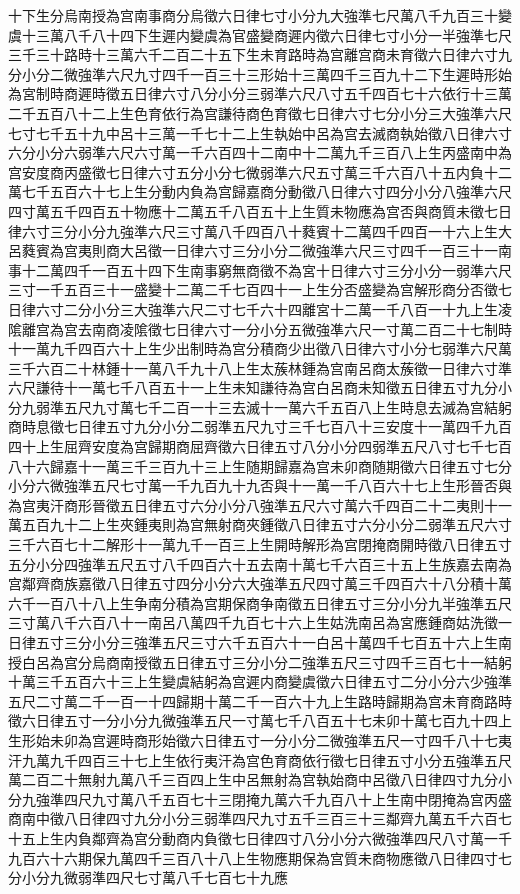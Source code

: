 {十下生分烏南授為宫南事商分烏徵六日律七寸小分九大強準七尺萬八千九百三十變虞十三萬八千八十四下生遲内變虞為官盛變商遲内徵六日律七寸小分一半強準七尺三千三十路時十三萬六千二百二十五下生未育路時為宫離宫商未育徵六日律六寸九分小分二微強準六尺九寸四千一百三十三形始十三萬四千三百九十二下生遲時形始為宮制時商遲時徵五日律六寸八分小分三弱準六尺八寸五千四百七十六依行十三萬二千五百八十二上生色育依行為宫謙待商色育徵七日律六寸七分小分三大強準六尺七寸七千五十九中呂十三萬一千七十二上生執始中呂為宫去滅商執始徵八日律六寸六分小分六弱準六尺六寸萬一千六百四十二南中十二萬九千三百八上生丙盛南中為宫安度商丙盛徵七日律六寸五分小分七微弱準六尺五寸萬三千六百八十五内負十二萬七千五百六十七上生分動内負為宫歸嘉商分動徵八日律六寸四分小分八強準六尺四寸萬五千四百五十物應十二萬五千八百五十上生質未物應為宫否與商質未徵七日律六寸三分小分九強準六尺三寸萬八千四百八十蕤賓十二萬四千四百一十六上生大呂蕤賓為宫夷則商大呂徵一日律六寸三分小分二微強準六尺三寸四千一百三十一南事十二萬四千一百五十四下生南事窮無商徵不為宮十日律六寸三分小分一弱準六尺三寸一千五百三十一盛變十二萬二千七百四十一上生分否盛變為宫解形商分否徵七日律六寸二分小分三大強準六尺二寸七千六十四離宮十二萬一千八百一十九上生凌隂離宫為宫去南商凌隂徵七日律六寸一分小分五微強凖六尺一寸萬二百二十七制時十一萬九千四百六十上生少出制時為宫分積商少出徵八日律六寸小分七弱準六尺萬三千六百二十林鍾十一萬八千九十八上生太蔟林鍾為宫南呂商太蔟徵一日律六寸準六尺謙待十一萬七千八百五十一上生未知謙待為宫白呂商未知徵五日律五寸九分小分九弱準五尺九寸萬七千二百一十三去滅十一萬六千五百八上生時息去滅為宫結躬商時息徵七日律五寸九分小分二弱準五尺九寸三千七百八十三安度十一萬四千九百四十上生屈齊安度為宫歸期商屈齊徵六日律五寸八分小分四弱準五尺八寸七千七百八十六歸嘉十一萬三千三百九十三上生随期歸嘉為宫未卯商随期徵六日律五寸七分小分六微強準五尺七寸萬一千九百九十九否與十一萬一千八百六十七上生形晉否與為宫夷汗商形晉徵五日律五寸六分小分八強準五尺六寸萬六千四百二十二夷則十一萬五百九十二上生夾鍾夷則為宫無射商夾鍾徵八日律五寸六分小分二弱準五尺六寸三千六百七十二解形十一萬九千一百三上生開時解形為宫閉掩商開時徵八日律五寸五分小分四強準五尺五寸八千四百六十五去南十萬七千六百三十五上生族嘉去南為宫鄰齊商族嘉徵八日律五寸四分小分六大強準五尺四寸萬三千四百六十八分積十萬六千一百八十八上生争南分積為宫期保商争南徵五日律五寸三分小分九半強準五尺三寸萬八千六百八十一南呂八萬四千九百七十六上生姑洗南呂為宮應鍾商姑洗徵一日律五寸三分小分三強準五尺三寸六千五百六十一白呂十萬四千七百五十六上生南授白呂為宫分烏商南授徵五日律五寸三分小分二強準五尺三寸四千三百七十一結躬十萬三千五百六十三上生變虞結躬為宫遲内商變虞徵六日律五寸二分小分六少強準五尺二寸萬二千一百一十四歸期十萬二千一百六十九上生路時歸期為宫未育商路時徵六日律五寸一分小分九微強準五尺一寸萬七千八百五十七未卯十萬七百九十四上生形始未卯為宫遲時商形始徵六日律五寸一分小分二微強準五尺一寸四千八十七夷汗九萬九千四百三十七上生依行夷汗為宫色育商依行徵七日律五寸小分五強準五尺萬二百二十無射九萬八千三百四上生中呂無射為宫執始商中呂徵八日律四寸九分小分九強準四尺九寸萬八千五百七十三閉掩九萬六千九百八十上生南中閉掩為宫丙盛商南中徵八日律四寸九分小分三弱準四尺九寸五千三百三十三鄰齊九萬五千六百七十五上生内負鄰齊為宫分動商内負徵七日律四寸八分小分六微強準四尺八寸萬一千九百六十六期保九萬四千三百八十八上生物應期保為宫質未商物應徵八日律四寸七分小分九微弱準四尺七寸萬八千七百七十九應}
